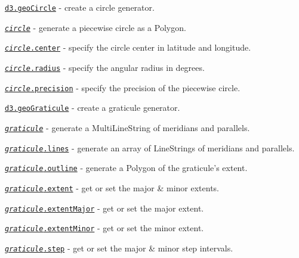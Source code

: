 \begin{DoxyItemize}
\item \href{https://github.com/d3/d3-geo/blob/master/README.md#geoCircle}{\tt d3.\+geo\+Circle} -\/ create a circle generator.
\item \href{https://github.com/d3/d3-geo/blob/master/README.md#_circle}{\tt {\itshape circle}} -\/ generate a piecewise circle as a Polygon.
\item \href{https://github.com/d3/d3-geo/blob/master/README.md#circle_center}{\tt {\itshape circle}.center} -\/ specify the circle center in latitude and longitude.
\item \href{https://github.com/d3/d3-geo/blob/master/README.md#circle_radius}{\tt {\itshape circle}.radius} -\/ specify the angular radius in degrees.
\item \href{https://github.com/d3/d3-geo/blob/master/README.md#circle_precision}{\tt {\itshape circle}.precision} -\/ specify the precision of the piecewise circle.
\item \href{https://github.com/d3/d3-geo/blob/master/README.md#geoGraticule}{\tt d3.\+geo\+Graticule} -\/ create a graticule generator.
\item \href{https://github.com/d3/d3-geo/blob/master/README.md#_graticule}{\tt {\itshape graticule}} -\/ generate a Multi\+Line\+String of meridians and parallels.
\item \href{https://github.com/d3/d3-geo/blob/master/README.md#graticule_lines}{\tt {\itshape graticule}.lines} -\/ generate an array of Line\+Strings of meridians and parallels.
\item \href{https://github.com/d3/d3-geo/blob/master/README.md#graticule_outline}{\tt {\itshape graticule}.outline} -\/ generate a Polygon of the graticule’s extent.
\item \href{https://github.com/d3/d3-geo/blob/master/README.md#graticule_extent}{\tt {\itshape graticule}.extent} -\/ get or set the major \& minor extents.
\item \href{https://github.com/d3/d3-geo/blob/master/README.md#graticule_extentMajor}{\tt {\itshape graticule}.extent\+Major} -\/ get or set the major extent.
\item \href{https://github.com/d3/d3-geo/blob/master/README.md#graticule_extentMinor}{\tt {\itshape graticule}.extent\+Minor} -\/ get or set the minor extent.
\item \href{https://github.com/d3/d3-geo/blob/master/README.md#graticule_step}{\tt {\itshape graticule}.step} -\/ get or set the major \& minor step intervals.

\end{DoxyItemize}

